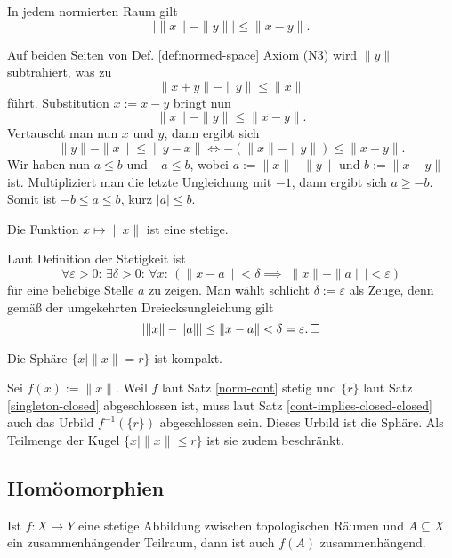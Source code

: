 \begin{Satz}%
\label{rev-tineq}%
\newlinefirst
In jedem normierten Raum gilt
\[|\|x\|-\|y\|| \le \|x-y\|.\]
\end{Satz}
\begin{Beweis}
Auf beiden Seiten von Def. \ref{def:normed-space}
Axiom (N3) wird $\|y\|$ subtrahiert, was zu
\[\|x+y\| - \|y\| \le \|x\|\]
führt. Substitution $x:=x-y$ bringt nun
\[\|x\| - \|y\| \le \|x-y\|.\]
Vertauscht man nun $x$ und $y$, dann ergibt sich
\[\|y\|-\|x\| \le \|y-x\| \iff -(\|x\|-\|y\|)\le \|x-y\|.\]
Wir haben nun $a\le b$ und $-a\le b$,
wobei $a:=\|x\|-\|y\|$ und $b:=\|x-y\|$ ist. Multipliziert
man die letzte Ungleichung mit $-1$, dann ergibt sich $a\ge -b$.
Somit ist $-b\le a\le b$, kurz $|a|\le b$.\,\qedsymbol
\end{Beweis}

\begin{Satz}\label{norm-cont}
Die Funktion $x\mapsto\|x\|$ ist eine stetige.
\end{Satz}
\begin{Beweis}
Laut Definition der Stetigkeit ist
\[\forall\varepsilon{>}0\colon\,\exists\delta{>}0\colon\,\forall x\colon\,
(\|x-a\| < \delta \implies |\|x\|-\|a\|| < \varepsilon)\]
für eine beliebige Stelle $a$ zu zeigen. Man wählt schlicht
$\delta:=\varepsilon$ als Zeuge, denn gemäß der umgekehrten
Dreiecksungleichung gilt
\[|\|x\|-\|a\|| \le \|x-a\| < \delta = \varepsilon.\,\square\]
\end{Beweis}

\begin{Satz}
Die Sphäre $\{x\mid \|x\| = r\}$ ist kompakt.
\end{Satz}
\begin{Beweis}
Sei $f(x):=\|x\|$. Weil $f$ laut Satz \ref{norm-cont} stetig
und $\{r\}$ laut Satz \ref{singleton-closed} abgeschlossen ist, muss
laut Satz \ref{cont-implies-closed-closed}
auch das Urbild $f^{-1}(\{r\})$ abgeschlossen sein. Dieses Urbild ist die
Sphäre. Als Teilmenge der Kugel $\{x\mid\|x\|\le r\}$ ist
sie zudem beschränkt.\,\qedsymbol
\end{Beweis}

\newpage
\subsection{Homöomorphien}
\begin{Satz}%
\label{intermediate-value-general}\newlinefirst
Ist $f\colon X\to Y$ eine stetige Abbildung zwischen topologischen
Räumen und $A\subseteq X$ ein zusammenhängender Teilraum,
dann ist auch $f(A)$ zusammenhängend.
\end{Satz}

